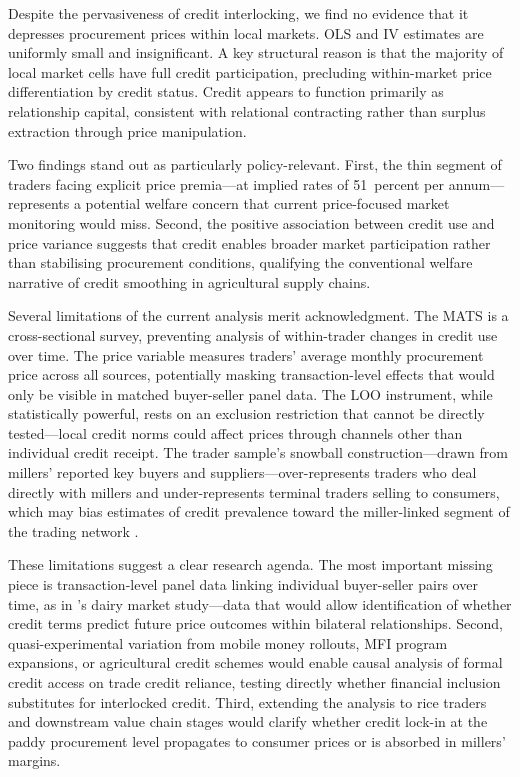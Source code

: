 \documentclass[authoryear,preprint,review,12pt]{elsarticle}
\begin{document}
Despite the pervasiveness of credit interlocking, we find no evidence that
it depresses procurement prices within local markets. OLS and IV estimates
are uniformly small and insignificant. A key structural reason is that the
majority of local market cells have full credit participation, precluding
within-market price differentiation by credit status. Credit appears to
function primarily as relationship capital, consistent with relational
contracting rather than surplus extraction through price manipulation.

Two findings stand out as particularly policy-relevant. First, the thin
segment of traders facing explicit price premia---at implied rates of 51~percent
per annum---represents a potential welfare concern that current price-focused
market monitoring would miss. Second, the positive association between credit
use and price variance suggests that credit enables broader market participation
rather than stabilising procurement conditions, qualifying the conventional
welfare narrative of credit smoothing in agricultural supply chains.

Several limitations of the current analysis merit acknowledgment. The MATS
is a cross-sectional survey, preventing analysis of within-trader changes
in credit use over time. The price variable measures traders' average
monthly procurement price across all sources, potentially masking
transaction-level effects that would only be visible in matched buyer-seller
panel data. The LOO instrument, while statistically powerful, rests on an
exclusion restriction that cannot be directly tested---local credit norms
could affect prices through channels other than individual credit receipt.
The trader sample's snowball construction---drawn from millers' reported key
buyers and suppliers---over-represents traders who deal directly with millers
and under-represents terminal traders selling to consumers, which may bias
estimates of credit prevalence toward the miller-linked segment of the
trading network \citep{dorosh_etal2021}.

These limitations suggest a clear research agenda. The most important
missing piece is transaction-level panel data linking individual buyer-seller
pairs over time, as in \citet{casaburi_macchiavello2019}'s dairy market
study---data that would allow identification of whether credit terms predict
future price outcomes within bilateral relationships. Second, quasi-experimental
variation from mobile money rollouts, MFI program expansions, or agricultural
credit schemes would enable causal analysis of formal credit access on
trade credit reliance, testing directly whether financial inclusion substitutes
for interlocked credit. Third, extending the analysis to rice traders and
downstream value chain stages would clarify whether credit lock-in at
the paddy procurement level propagates to consumer prices or is absorbed
in millers' margins.
\end{document}
